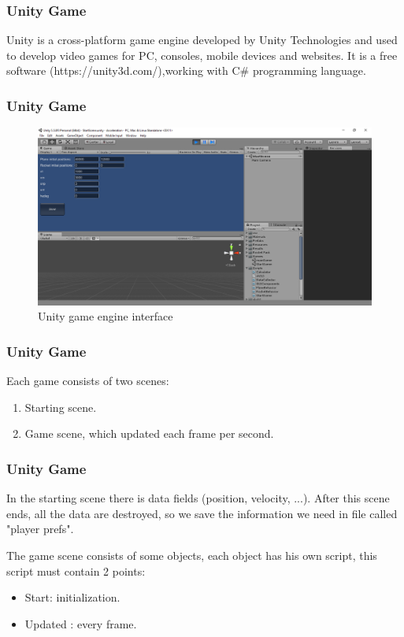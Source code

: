 \documentclass{beamer}
\begin{document}
\begin{frame}
\frametitle{Unity Game}
Unity is a cross-platform game engine developed by Unity Technologies and used to develop video games for PC, consoles, mobile devices and websites. It is a free software (https://unity3d.com/),working with C\# programming language. 
\end{frame}
\begin{frame}
\frametitle{Unity Game}
\begin{figure}[H]
	\centering
	\includegraphics[scale = 0.2]{fig/unityInterface.PNG}
	\caption{Unity game engine interface }
	\label{UnityInterface}
\end{figure}
\end{frame}
\begin{frame}
\frametitle{Unity Game}
Each game consists of two scenes:
\begin{enumerate}
	\item Starting scene.
	\item Game scene, which updated each frame per second.
\end{enumerate}
\end{frame}
\begin{frame}
\frametitle{Unity Game}
In the starting scene there is data fields (position, velocity, ...). After this scene ends, all the data are destroyed, so we save the information we need in file called "player prefs".

The game scene consists of some objects, each object has his own script, this script must contain 2 points:
\begin{itemize}
	\item Start: initialization.
	\item Updated : every frame.
\end{itemize} 
\end{frame}
\end{document}
